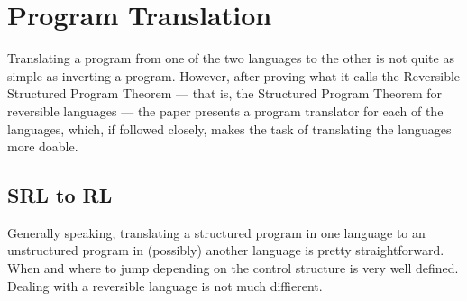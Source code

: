 \section{Program Translation}
Translating a program from one of the two languages to the other is not quite as simple as inverting a program. However, after proving what it calls the Reversible Structured Program Theorem --- that is, the Structured Program Theorem for reversible languages --- the paper \cite{REV} presents a program translator for each of the languages, which, if followed closely, makes the task of translating the languages more doable.

\subsection{SRL to RL}

Generally speaking, translating a structured program in one language to an unstructured program in (possibly) another language is pretty straightforward. When and where to jump depending on the control structure is very well defined. Dealing with a reversible language is not much diffierent.

